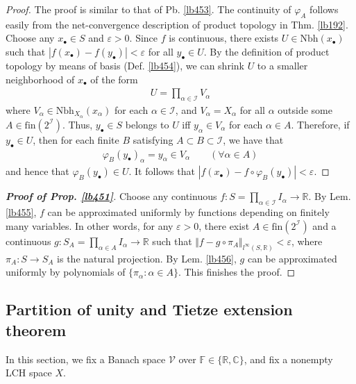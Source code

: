 \documentclass[12pt,b5paper,notitlepage]{article}
\theoremstyle{definition}
\theoremstyle{plain}
\newcommand{\mc}{\mathcal}
\newcommand{\scr}{\mathscr}
\newcommand{\blt}{\bullet}
\newcommand{\Cbb}{\mathbb C}
\newcommand{\Rbb}{\mathbb R}
\newcommand{\fin}{\mathrm{fin}}
\newcommand{\Fbb}{\mathbb F}
\newcommand{\Nbh}{\mathrm{Nbh}}
\newcommand{\eps}{\varepsilon}
\numberwithin{equation}{section}
\begin{document}
\begin{proof}
The proof is similar to that of Pb. \ref{lb453}. The continuity of $\varphi_A$ follows easily from the net-convergence description of product topology in Thm. \ref{lb192}. Choose any $x_\blt\in S$ and $\eps>0$. Since $f$ is continuous, there exists $U\in\Nbh(x_\blt)$ such that $|f(x_\blt)-f(y_\blt)|<\eps$ for all $y_\blt\in U$. By the definition of product topology by means of basis (Def. \ref{lb454}), we can shrink $U$ to a smaller neighborhood of $x_\blt$ of the form
\begin{align*}
U=\prod_{\alpha\in \scr I}V_\alpha
\end{align*}
where $V_\alpha\in\Nbh_{X_\alpha}(x_\alpha)$ for each $\alpha\in\scr I$, and $V_\alpha=X_\alpha$ for all $\alpha$ outside some $A\in\fin(2^{\scr I})$. Thus, $y_\blt\in S$ belongs to $U$ iff $y_\alpha\in V_\alpha$ for each $\alpha\in A$. Therefore, if $y_\blt\in U$, then for each finite $B$ satisfying $A\subset B\subset\scr I$, we have that
\begin{align*}
\varphi_B(y_\blt)_\alpha=y_\alpha\in V_\alpha\qquad(\forall\alpha\in A)
\end{align*}
and hence that $\varphi_B(y_\blt)\in U$. It follows that $|f(x_\blt)-f\circ\varphi_B(y_\blt)|<\eps$.
\end{proof}


\begin{proof}[\textbf{Proof of Prop. \ref{lb451}}]
Choose any continuous $f:S=\prod_{\alpha\in\scr I}I_\alpha\rightarrow\Rbb$. By Lem. \ref{lb455}, $f$ can be approximated uniformly by functions depending on finitely many variables. In other words, for any $\eps>0$, there exist $A\in\fin(2^{\scr I})$ and a continuous $g:S_A=\prod_{\alpha\in A}I_\alpha\rightarrow\Rbb$ such that $\Vert f-g\circ\pi_A\Vert_{l^\infty(S,\Rbb)}<\eps$, where $\pi_A:S\rightarrow S_A$ is the natural projection. By Lem. \ref{lb456}, $g$ can be approximated uniformly by polynomials of $\{\pi_\alpha:\alpha\in A\}$. This finishes the proof.
\end{proof}




\subsection{Partition of unity and Tietze extension theorem}\label{lb464}


In this section, we fix a Banach space $\mc V$ over $\Fbb\in\{\Rbb,\Cbb\}$, and fix a nonempty LCH space $X$.
\end{document}
